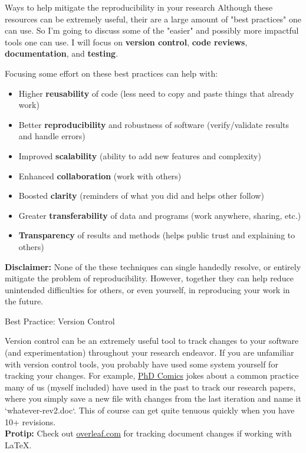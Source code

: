 \documentclass[final]{beamer}
\newlength{\colwidth}
\begin{document}
\begin{frame}[t]
\begin{columns}[t]
\begin{column}{\colwidth}
\begin{exampleblock}{Ways to help mitigate the reproducibility in your research}
    Although these resources can be extremely useful, their are a large amount
    of "best practices" one can use.
    So I'm going to discuss some of the "easier" and possibly more impactful
    tools one can use.
    I will focus on \textbf{version control}, \textbf{code reviews},
    \textbf{documentation}, and \textbf{testing}.
    
    Focusing some effort on these best practices can help with:
    \begin{itemize}
      \item Higher \textbf{reusability} of code (less need to copy and paste
        things that already work)
      \item Better \textbf{reproducibility} and robustness of software
        (verify/validate results and handle errors)
      \item Improved \textbf{scalability} (ability to add new features and
        complexity)
      \item Enhanced \textbf{collaboration} (work with others)
      \item Boosted \textbf{clarity} (reminders of what you did and helps other
        follow)
      \item Greater \textbf{transferability} of data and programs (work
        anywhere, sharing, etc.)
      \item \textbf{Transparency} of results and methods (helps public trust
        and explaining to others)
    \end{itemize}
    
    \textbf{Disclaimer:} None of the these techniques can single handedly
    resolve, or entirely mitigate the problem of reproducibility.
    However, together they can help reduce unintended difficulties for others,
    or even yourself, in reproducing your work in the future.

  \end{exampleblock}

  \begin{block}{Best Practice: Version Control}

    Version control can be an extremely useful tool to track changes to your
    software (and experimentation) throughout your research endeavor.
    If you are unfamiliar with version control tools, you probably have used
    some system yourself for tracking your changes.
    For example,
    \href{https://phdcomics.com/comics/archive.php?comicid=1531}{PhD Comics}
    jokes about a common practice many of us (myself included) have used in the
    past to track our research papers, where you simply save a new file with
    changes from the last iteration and name it `whatever-rev2.doc`.
    This of course can get quite tenuous quickly when you have 10+ revisions.
    \\
    \textbf{Protip:} Check out \href{overleaf.com}{overleaf.com} for tracking
    document changes if working with LaTeX.


\end{block}
\end{column}
\end{columns}
\end{frame}
\end{document}
